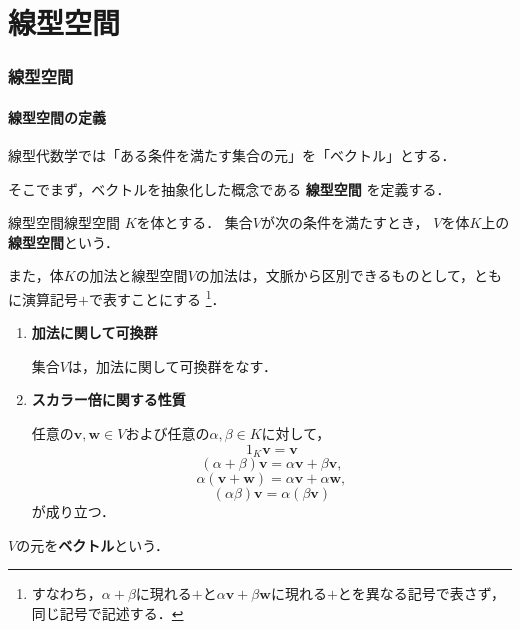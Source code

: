 \part{線型空間}

\begin{abstract}
  この章では「線型空間」について学ぶ．
  高校までの学習では「ベクトル」を「平面や空間内で，向きと大きさを持った量」として説明することが多かった．
  一方，線型代数学では，ベクトルを「ある条件を満たす集合の元」として抽象的に扱う．
  この考え方により，数ベクトルだけでなく，行列や関数なども同じ枠組みで議論できるようになる．
\end{abstract}

\section{線型空間}

\subsection{線型空間の定義}


線型代数学では「ある条件を満たす集合の元」を「ベクトル」とする．

そこでまず，ベクトルを抽象化した概念である
\textbf{線型空間}
を定義する．

\begin{definition}{線型空間}{線型空間}
  $K$を体とする．
  集合$V$が次の条件を満たすとき，
  $V$を体$K$上の\textbf{線型空間}という．

また，体$K$の加法と線型空間$V$の加法は，文脈から区別できるものとして，ともに演算記号$+$で表すことにする
\footnote{すなわち，$\alpha+\beta$に現れる$+$と$\alpha\bm{v}+\beta\bm{w}$に現れる$+$とを異なる記号で表さず，同じ記号で記述する．}．
\begin{enumerate}[label=(\roman*),leftmargin=3.2em]
  \item \textbf{加法に関して可換群} 
  
  集合$V$は，加法に関して可換群をなす．
  \item \textbf{スカラー倍に関する性質} 
 
  任意の$\bm{v},\bm{w}\in V$および任意の$\alpha,\beta\in K$に対して，
  \[
  1_K \bm{v}=\bm{v}
  \]
  \[
  (\alpha+\beta) \bm{v}=\alpha \bm{v}+\beta \bm{v},
  \]
  \[
  \alpha(\bm{v}+\bm{w})=\alpha \bm{v}+\alpha \bm{w},
  \]
  \[
  (\alpha\beta)\bm{v}=\alpha(\beta \bm{v})
  \]
  が成り立つ．
  \end{enumerate}

  $V$の元を\textbf{ベクトル}という．
\end{definition}

